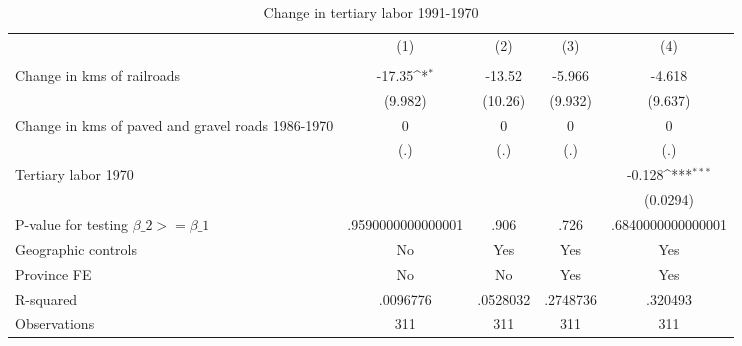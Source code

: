 \begin{table}[htbp]\centering
\def\sym#1{\ifmmode^{#1}\else\(^{#1}\)\fi}
\caption{Change in tertiary labor 1991-1970}
\begin{tabular}{l*{4}{c}}
\hline\hline
                &\multicolumn{1}{c}{(1)}&\multicolumn{1}{c}{(2)}&\multicolumn{1}{c}{(3)}&\multicolumn{1}{c}{(4)}\\
                &\multicolumn{1}{c}{}&\multicolumn{1}{c}{}&\multicolumn{1}{c}{}&\multicolumn{1}{c}{}\\
\hline
Change in kms of railroads&   -17.35\sym{*}  &   -13.52         &   -5.966         &   -4.618         \\
                &  (9.982)         &  (10.26)         &  (9.932)         &  (9.637)         \\
[1em]
Change in kms of paved and gravel roads 1986-1970&        0         &        0         &        0         &        0         \\
                &      (.)         &      (.)         &      (.)         &      (.)         \\
[1em]
Tertiary labor 1970&                  &                  &                  &   -0.128\sym{***}\\
                &                  &                  &                  & (0.0294)         \\
\hline
P-value for testing $\beta\_{2} >= \beta\_{1}$&.9590000000000001         &     .906         &     .726         &.6840000000000001         \\
Geographic controls&       No         &      Yes         &      Yes         &      Yes         \\
Province FE     &       No         &       No         &      Yes         &      Yes         \\
R-squared       & .0096776         & .0528032         & .2748736         &  .320493         \\
Observations    &      311         &      311         &      311         &      311         \\
\hline\hline
\end{tabular}
\end{table}
